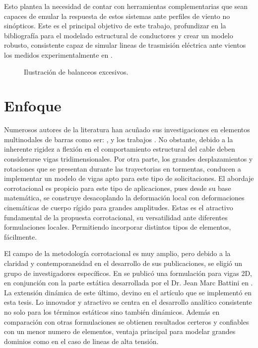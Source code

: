 Esto plantea la necesidad de contar con herramientas complementarias que sean capaces de emular la respuesta de estos sistemas ante perfiles de viento no sinópticos. Este es el principal objetivo de este trabajo, profundizar en la bibliografía para el modelado estructural de conductores y crear un modelo robusto, consistente capaz de simular lineas de trasmisión eléctrica ante vientos los medidos experimentalmente en \cite{stengel2017measurements}. 


\begin{figure}[htbp]
	\centering
	\def\svgwidth{100mm}
	
	\caption{Ilustración de balanceos excesivos.}
	\label{fig:INTRO:IlusExcesiveBalance}
\end{figure}  

\section{Enfoque}

Numerosos autores de la literatura han acuñado sus investigaciones en elementos multinodales de barras como ser: \cite{desai1995finite}, \cite{yan2009numerical} y los trabajos \cite{gani2010dynamic} \cite{yang2016nonlinear}. No obstante, debido a la inherente rigidez a flexión en el comportamiento estructural del cable deben considerarse vigas tridimensionales. Por otra parte, los grandes desplazamientos y rotaciones que se presentan durante las trayectorias en tormentas, conducen a implementar un modelo de vigas apto para este tipo de solicitaciones. El abordaje corrotacional es propicio para este tipo de aplicaciones, pues desde su base matemática, se construye desacoplando la deformación local con deformaciones cinemáticas de cuerpo rígido para grandes amplitudes. Estas es el atractivo fundamental de la propuesta corrotacional, su versatilidad ante diferentes formulaciones locales. Permitiendo incorporar distintos tipos de elementos, fácilmente.

El campo de la metodología corrotacional es muy amplio, pero debido a la claridad y contemporaneidad en el desarrollo de sus publicaciones, se eligió un grupo de investigadores específicos. En \citep{Le2011} se publicó una formulación para vigas 2D, en conjunción con la parte estática desarrollada por el Dr. Jean Marc Battini  en \citep{Battini2002}. La extensión dinámica de este último, devino en el artículo \citep{Le2014} que se implementó en esta tesis. Lo innovador y atractivo se centra en el desarrollo analítico consistente no solo para los términos estáticos sino también dinámicos. Además en comparación con otras formulaciones se obtienen resultados certeros y confiables con un menor numero de elementos, ventaja principal para modelar grandes dominios como en el caso de lineas de alta tensión.  

